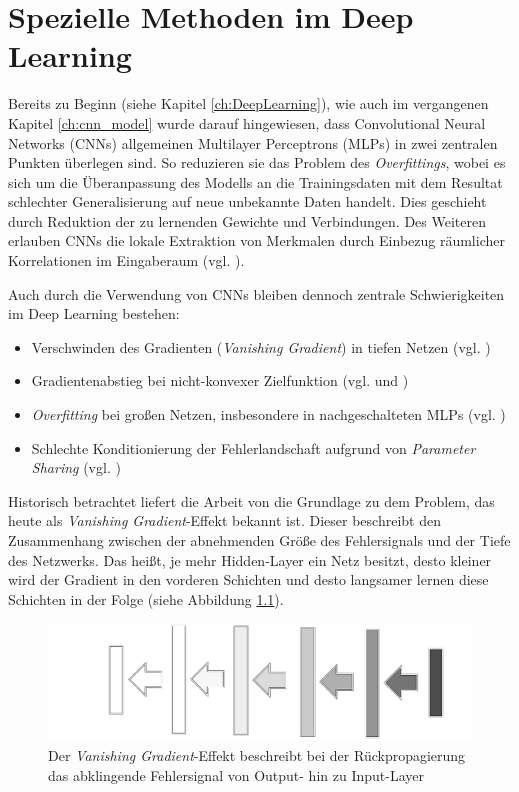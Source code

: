 \chapter{Spezielle Methoden im Deep Learning}
Bereits zu Beginn (siehe Kapitel \ref{ch:DeepLearning}), wie auch im vergangenen Kapitel \ref{ch:cnn_model} wurde darauf hingewiesen, dass Convolutional Neural Networks (CNNs) allgemeinen Multilayer Perceptrons (MLPs) in zwei zentralen Punkten überlegen sind. So reduzieren sie das Problem des \textit{Overfittings}, wobei es sich um die Überanpassung des Modells an die Trainingsdaten mit dem Resultat schlechter Generalisierung auf neue unbekannte Daten handelt. Dies geschieht durch Reduktion der zu lernenden Gewichte und Verbindungen. Des Weiteren erlauben CNNs die lokale Extraktion von Merkmalen durch Einbezug räumlicher Korrelationen im Eingaberaum (vgl. \cite{LeCun1998}). 

Auch durch die Verwendung von CNNs bleiben dennoch zentrale Schwierigkeiten im Deep Learning bestehen:
\begin{itemize}
\item Verschwinden des Gradienten (\textit{Vanishing Gradient}) in tiefen Netzen (vgl. \cite{Hochreiter1991})
\item Gradientenabstieg bei nicht-konvexer Zielfunktion (vgl. \cite{Martens2010} und \cite{Dauphin14})
\item \textit{Overfitting} bei großen Netzen, insbesondere in nachgeschalteten MLPs (vgl. \cite{Hinton2012})
\item Schlechte Konditionierung der Fehlerlandschaft aufgrund von \textit{Parameter Sharing} (vgl. \cite{LeCun1998})
\end{itemize}

Historisch betrachtet liefert die Arbeit von \cite{Hochreiter1991} die Grundlage zu dem Problem, das heute als \textit{Vanishing Gradient}-Effekt bekannt ist. Dieser beschreibt den Zusammenhang zwischen der abnehmenden Größe des Fehlersignals und der Tiefe des Netzwerks. Das heißt, je mehr Hidden-Layer ein Netz besitzt, desto kleiner wird der Gradient in den vorderen Schichten und desto langsamer lernen diese Schichten in der Folge (siehe Abbildung \ref{fig:4_vanishing_gradient}).

\begin{figure}
\centering
\includegraphics[width=0.7\linewidth]{images/4_vanishing_gradient}
\caption[]{Der \textit{Vanishing Gradient}-Effekt beschreibt bei der Rückpropagierung das abklingende Fehlersignal von Output- hin zu Input-Layer}
\label{fig:4_vanishing_gradient}
\end{figure}

